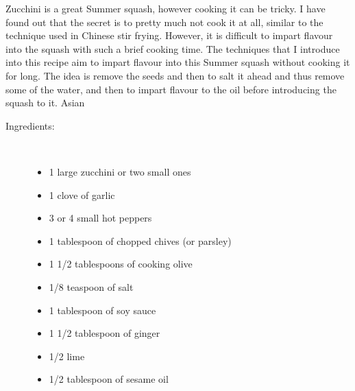 \documentclass[11pt,letterpaper]{article}
\begin{document}


Zucchini is a great Summer squash, however cooking it can be tricky. I have found out that the secret is to pretty much not cook it at all, similar to the technique used in Chinese stir frying. However, it is difficult to impart flavour into the squash with such a brief cooking time. The techniques that I introduce into this recipe aim to impart flavour into this Summer squash without cooking it for long. The idea is remove the seeds and then to salt it ahead and thus remove some of the water, and then to impart flavour to the oil before introducing the squash to it. Asian

\begin{description}

\item[Ingredients:]\ \\
	\begin{itemize}
	\item 1 large zucchini or two small ones
	\item 1 clove of garlic
	\item 3 or 4 small hot peppers
	\item 1 tablespoon of chopped chives (or parsley)
	\item 1 1/2 tablespoons of cooking olive
	\item 1/8 teaspoon of salt
        \item 1 tablespoon of soy sauce
        \item 1 1/2 tablespoon of ginger
        \item 1/2 lime
        \item 1/2 tablespoon of sesame oil
	\end{itemize}


\end{description}
\end{document}
